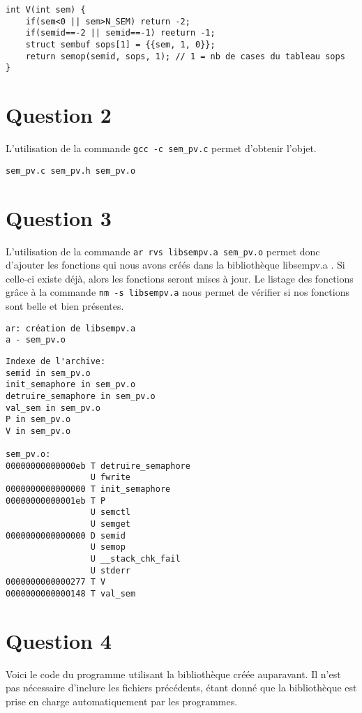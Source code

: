 \begin{lstlisting}
int V(int sem) {
    if(sem<0 || sem>N_SEM) return -2;
    if(semid==-2 || semid==-1) reeturn -1;
    struct sembuf sops[1] = {{sem, 1, 0}};
    return semop(semid, sops, 1); // 1 = nb de cases du tableau sops
}
\end{lstlisting}

\section{Question 2}
L'utilisation de la commande \lstinline{gcc -c sem_pv.c} permet d'obtenir l'objet.

\begin{lstlisting}
sem_pv.c sem_pv.h sem_pv.o
\end{lstlisting}

\section{Question 3}

L'utilisation de la commande \lstinline{ar rvs libsempv.a sem_pv.o} permet donc d'ajouter les fonctions qui nous avons créés dans la bibliothèque libsempv.a . Si celle-ci existe déjà, alors les fonctions seront mises à jour. Le listage des fonctions grâce à la commande \lstinline{nm -s libsempv.a} nous permet de vérifier si nos fonctions sont belle et bien présentes.

\begin{lstlisting}
ar: création de libsempv.a
a - sem_pv.o
\end{lstlisting}

\begin{lstlisting}
Indexe de l'archive:
semid in sem_pv.o
init_semaphore in sem_pv.o
detruire_semaphore in sem_pv.o
val_sem in sem_pv.o
P in sem_pv.o
V in sem_pv.o

sem_pv.o:
00000000000000eb T detruire_semaphore
                 U fwrite
0000000000000000 T init_semaphore
00000000000001eb T P
                 U semctl
                 U semget
0000000000000000 D semid
                 U semop
                 U __stack_chk_fail
                 U stderr
0000000000000277 T V
0000000000000148 T val_sem
\end{lstlisting}

\section{Question 4}
Voici le code du programme utilisant la bibliothèque créée auparavant. Il n'est pas nécessaire d'inclure les fichiers précédents, étant donné que la bibliothèque est prise en charge automatiquement par les programmes.

